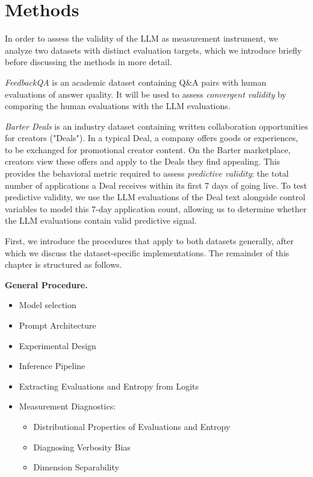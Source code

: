 
\section{Methods}

In order to assess the validity of the LLM as measurement instrument, we analyze two datasets with distinct evaluation targets, which we introduce briefly before discussing the methods in more detail.

\textit{FeedbackQA} \citep{li_using_2022} is an academic dataset containing Q\&A pairs with human evaluations of answer quality. It will be used to assess \textit{convergent validity} by comparing the human evaluations with the LLM evaluations. 

\textit{Barter Deals} is an industry dataset containing written collaboration opportunities for creators ("Deals"). In a typical Deal, a company offers goods or experiences, to be exchanged for promotional creator content. On the Barter marketplace, creators view these offers and apply to the Deals they find appealing. This provides the behavioral metric required to assess \textit{predictive validity}: the total number of applications a Deal receives within its first 7 days of going live. To test predictive validity, we use the LLM evaluations of the Deal text alongside control variables to model this 7-day application count, allowing us to determine whether the LLM evaluations contain valid predictive signal.

First, we introduce the procedures that apply to both datasets generally, after which we discuss the dataset-specific implementations. The remainder of this chapter is structured as follows.

\vspace{1em}
\noindent \textbf{General Procedure.}
\begin{itemize}[label=\textbullet]
    \item Model selection
    \item Prompt Architecture
    \item Experimental Design
    \item Inference Pipeline
    \item Extracting Evaluations and Entropy from Logits  
    \item Measurement Diagnostics:
    \begin{itemize}
        \item Distributional Properties of Evaluations and Entropy
        \item Diagnosing Verbosity Bias
        \item Dimension Separability
    \end{itemize}
\end{itemize}


